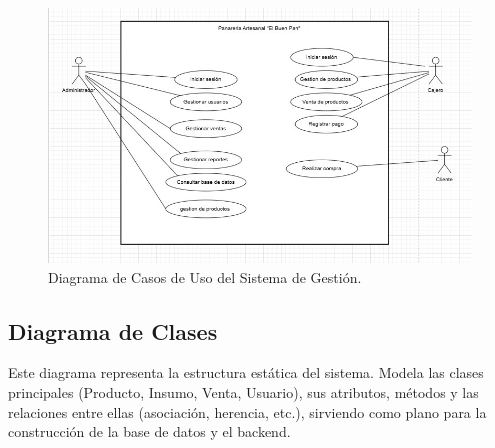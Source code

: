 \documentclass[conference]{IEEEtran}
\begin{document}
\begin{figure}[htbp]
\centerline{\includegraphics[width=0.9\columnwidth]{images/diagrama_casos_uso.jpg}}
\caption{Diagrama de Casos de Uso del Sistema de Gestión.}
\label{fig:casos_uso}
\end{figure}

\subsection{Diagrama de Clases}
Este diagrama representa la estructura estática del sistema. Modela las clases principales (Producto, Insumo, Venta, Usuario), sus atributos, métodos y las relaciones entre ellas (asociación, herencia, etc.), sirviendo como plano para la construcción de la base de datos y el backend.
\end{document}
